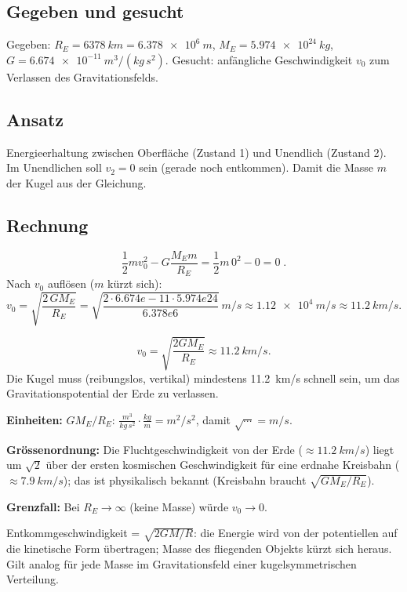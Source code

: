 
\subsection*{Gegeben und gesucht}
Gegeben: $R_E=\qty{6378}{km}=\qty{6.378e6}{m}$, $M_E=\qty{5.974e24}{kg}$,
$G=\qty{6.674e-11}{m^3/(kg\,s^2)}$.
Gesucht: anfängliche Geschwindigkeit $v_0$ zum Verlassen des Gravitationsfelds.

\subsection*{Ansatz}
Energieerhaltung zwischen Oberfläche (Zustand 1) und Unendlich (Zustand 2).
Im Unendlichen soll $v_2=0$ sein (gerade noch entkommen). Damit die Masse
$m$ der Kugel aus der Gleichung.

\subsection*{Rechnung}
\begin{equation}
  \frac12 m v_0^2 - G\frac{M_E m}{R_E}
  = \frac12 m\,0^2 - 0
  = 0\;.
\end{equation}
Nach $v_0$ auflösen ($m$ kürzt sich):
\begin{equation}
  v_0 = \sqrt{\frac{2\,G M_E}{R_E}}
  = \sqrt{\frac{2\cdot 6.674e-11\cdot 5.974e24}{6.378e6}}\ \si{m/s}
  \approx \qty{1.12e4}{m/s}
  \approx \qty{11.2}{km/s}.
\end{equation}

\begin{ergebnis}
\begin{equation*}
  v_0 = \sqrt{\frac{2GM_E}{R_E}} \approx \qty{11.2}{km/s}.
\end{equation*}
Die Kugel muss (reibungslos, vertikal) mindestens \qty{11.2}{km/s} schnell sein,
um das Gravitationspotential der Erde zu verlassen.
\end{ergebnis}

\begin{kontrolle}
\textbf{Einheiten:} $G M_E/R_E$:
$\frac{m^3}{kg\,s^2}\cdot\frac{kg}{m}=m^2/s^2$, damit $\sqrt{\cdots}=m/s$. \checkmark

\textbf{Grössenordnung:} Die Fluchtgeschwindigkeit von der Erde ($\approx
\qty{11.2}{km/s}$) liegt um $\sqrt2$ über der ersten kosmischen
Geschwindigkeit für eine erdnahe Kreisbahn ($\approx\qty{7.9}{km/s}$);
das ist physikalisch bekannt (Kreisbahn braucht $\sqrt{GM_E/R_E}$).

\textbf{Grenzfall:} Bei $R_E\to\infty$ (keine Masse) würde $v_0\to 0$.
\end{kontrolle}

\begin{merksatz}
Entkommgeschwindigkeit = $\sqrt{2GM/R}$: die Energie wird von der
potentiellen auf die kinetische Form übertragen; Masse des fliegenden
Objekts kürzt sich heraus. Gilt analog für jede Masse im Gravitationsfeld
einer kugelsymmetrischen Verteilung.
\end{merksatz}
